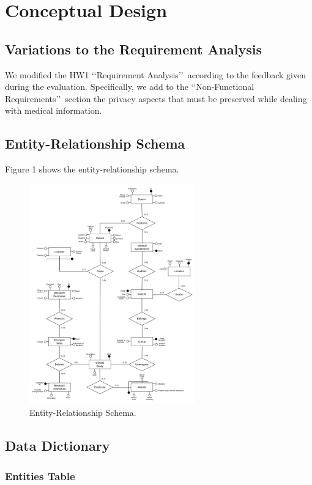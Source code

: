 \section{Conceptual Design}

\subsection{Variations to the Requirement Analysis}
We modified the HW1 \lq\lq Requirement Analysis\rq\rq\ according to the feedback given during the evaluation. Specifically, we add to the \lq\lq Non-Functional Requirements\rq\rq\ section the privacy aspects that must be preserved while dealing with medical information.

\subsection{Entity-Relationship Schema}
Figure 1 shows the entity-relationship schema.
\begin{figure}[htp]
    \centering
    \includegraphics[width = 0.64\textwidth]{src/schemas/er_schema.png}
    \caption{Entity-Relationship Schema.}
\end{figure}

\subsection{Data Dictionary}

\subsubsection{Entities Table}



